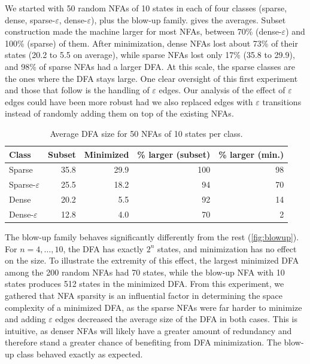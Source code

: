 \documentclass[9pt]{ieeeconf}
\begin{document}
We started with 50 random NFAs of 10 states in each of four classes (sparse, dense, sparse-$\varepsilon$, dense-$\varepsilon$), plus the blow-up family.  gives the averages. Subset construction made the machine larger for most NFAs, between 70\% (dense-$\varepsilon$) and 100\% (sparse) of them. After minimization, dense NFAs lost about 73\% of their states (20.2 to 5.5 on average), while sparse NFAs lost only 17\% (35.8 to 29.9), and 98\% of sparse NFAs had a larger DFA. At this scale, the sparse classes are the ones where the DFA stays large. One clear oversight of this first experiment and those that follow is the handling of $\varepsilon$ edges. Our analysis of the effect of $\varepsilon$ edges could have been more robust had we also replaced edges with $\varepsilon$ transitions instead of randomly adding them on top of the existing NFAs.

\begin{table}[t]
  \centering
  \caption{Average DFA size for 50 NFAs of 10 states per class.}
  \label{tab:small}
  \small
  \begin{tabular}{@{}lrrrr@{}}
    \toprule
    Class & Subset & Minimized & \% larger (subset) & \% larger (min.) \\
    \midrule
    Sparse & 35.8 & 29.9 & 100 & 98 \\
    Sparse-$\varepsilon$ & 25.5 & 18.2 & 94 & 70 \\
    Dense & 20.2 & 5.5 & 92 & 14 \\
    Dense-$\varepsilon$ & 12.8 & 4.0 & 70 & 2 \\
    \bottomrule
  \end{tabular}
\end{table}

The blow-up family behaves significantly differently from the rest (\cref{fig:blowup}). For $n=4,\dots,10$, the DFA has exactly $2^n$ states, and minimization has no effect on the size. To illustrate the extremity of this effect, the largest minimized DFA among the 200 random NFAs had 70 states, while the blow-up NFA with 10 states produces 512 states in the minimized DFA. From this experiment, we gathered that NFA sparsity is an influential factor in determining the space complexity of a minimized DFA, as the sparse NFAs were far harder to minimize and adding $\varepsilon$ edges decreased the average size of the DFA in both cases. This is intuitive, as denser NFAs will likely have a greater amount of redundancy and therefore stand a greater chance of benefiting from DFA minimization. The blow-up class behaved exactly as expected.
\end{document}
